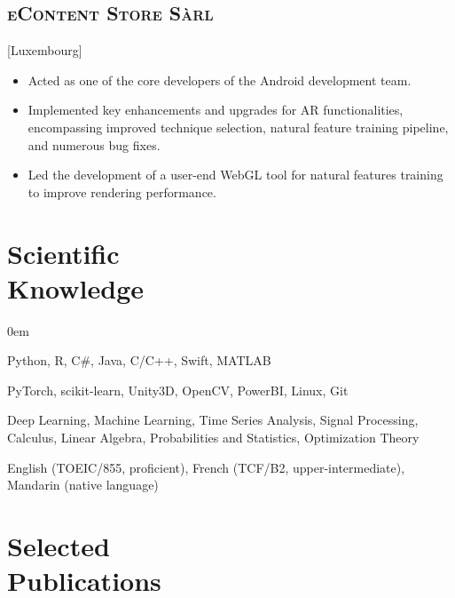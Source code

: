 \documentclass{mycv}
\begin{document}
\subsection{\scshape eContent Store S\`arl}[Luxembourg]

\begin{positions}
\end{positions}

\begin{itemize}
  \itemsep 0em
  \item Acted as one of the core developers of the Android development team.
  \item Implemented key enhancements and upgrades for AR functionalities, encompassing improved technique selection, natural feature training pipeline, and numerous bug fixes.
  \item Led the development of a user-end WebGL tool for natural features training to improve rendering performance.
\end{itemize}

\section{Scientific \\ Knowledge}

\begin{description}
  \itemsep 0em
  \item[Programming] Python, R, C\#, Java, C/C++, Swift, MATLAB
  \item[Frameworks \& Tools] PyTorch, scikit-learn, Unity3D, OpenCV, PowerBI, Linux, Git
  \item[Skills \& Expertise] Deep Learning, Machine Learning, Time Series Analysis, Signal Processing, Calculus, Linear Algebra, Probabilities and Statistics, Optimization Theory
  \item[Languages] English (TOEIC/855, proficient), French (TCF/B2, upper-intermediate), Mandarin (native language)
\end{description}

\section{Selected \\ Publications}

\end{document}
